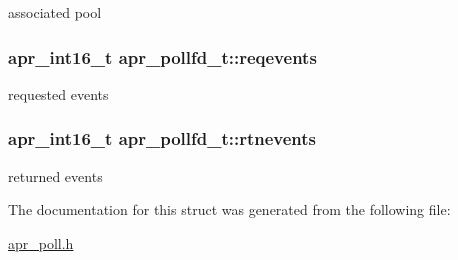 associated pool \hypertarget{structapr__pollfd__t_abcedac7097a97823a38ece6e47f4ea9f}{
\subsubsection[{reqevents}]{\setlength{\rightskip}{0pt plus 5cm}apr\-\_\-int16\-\_\-t apr\-\_\-pollfd\-\_\-t\-::reqevents}}\label{structapr__pollfd__t_abcedac7097a97823a38ece6e47f4ea9f}
requested events \hypertarget{structapr__pollfd__t_aed5b2109b27984975309922bfa84e3f6}{
\subsubsection[{rtnevents}]{\setlength{\rightskip}{0pt plus 5cm}apr\-\_\-int16\-\_\-t apr\-\_\-pollfd\-\_\-t\-::rtnevents}}\label{structapr__pollfd__t_aed5b2109b27984975309922bfa84e3f6}
returned events 

The documentation for this struct was generated from the following file\-:\begin{DoxyCompactItemize}
\item 
\hyperlink{apr__poll_8h}{apr\-\_\-poll.\-h}\end{DoxyCompactItemize}
